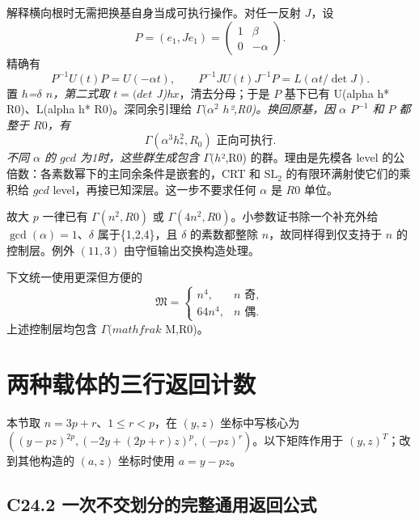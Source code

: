 \documentclass[11pt,a4paper]{article}
\theoremstyle{definition}
\numberwithin{equation}{section}
\begin{document}
{解释横向根时无需把换基自身当成可执行操作。对任一反射} {\ensuremath{J}，设} \[
P=(e_1,Je_1)=\begin{pmatrix}1&\beta\\0&-\alpha\end{pmatrix}.
\] {精确有} \[
P^{-1}U(t)P=U(-\alpha t),\qquad
P^{-1}J U(t)J^{-1}P=L(\alpha t/\det J).
\tag{C23.5.4}
\] {置} {\ensuremath{h}}\emph{{=\ensuremath{\delta }} {\ensuremath{n}，第二式取} {\ensuremath{t=(det}} {J)h}}{\ensuremath{x}，清去分母；于是} {\ensuremath{P}} {基下已有} {U(alpha} {h*} {R0)、L(alpha} {h*} {R0)。深同余引理给} {\ensuremath{\Gamma (\alpha ^{2}}} {\ensuremath{h}}\emph{{²,R0)。换回原基，因} {\ensuremath{\alpha }} {\ensuremath{P^{-1}}} {和} {\ensuremath{P}} {都整于} {\ensuremath{R0}，有} \[
\Gamma(\alpha^3h_*^2,R_0)\text{ 正向可执行}.
\tag{C23.5.5}
\] {不同} {\ensuremath{\alpha }} {的} {\ensuremath{gcd}} {为1时，这些群生成包含} {\ensuremath{\Gamma (h}}}{²,R0)} {的群。理由是先模各} {level} {的公倍数：各素数幂下的主同余条件是嵌套的，CRT} {和} {\ensuremath{\mathrm{SL}_{2}}} {的有限环满射使它们的乘积给} {\ensuremath{gcd}} {level，再接已知深层。这一步不要求任何} {\ensuremath{\alpha }} {是} {\ensuremath{R0}} {单位。}

{故大} {\ensuremath{p}} {一律已有} {\ensuremath{\Gamma (n^{2},R0)}} {或} {\ensuremath{\Gamma (4n^{2},R0)}。小参数证书除一个补充外给} {\ensuremath{\operatorname{gcd}(\alpha )=1}、\ensuremath{\delta }} {属于\{1,2,4\}，且} {\ensuremath{\delta }} {的素数都整除} {\ensuremath{n}，故同样得到仅支持于} {\ensuremath{n}} {的控制层。例外} \((11,3)\) {由守恒输出交换构造处理。}

{下文统一使用更深但方便的} \[
\mathfrak M=\begin{cases}n^4,&n\text{ 奇},\\64n^4,&n\text{ 偶}.
\end{cases}
\tag{C23.5.6}
\] {上述控制层均包含} {\ensuremath{\Gamma (mathfrak}} {M,R0)。}


\section{两种载体的三行返回计数}\label{construct:three-row-transport}
{本节取} \(n=3p+r\){、}\(1\le r<p\){，在} \((y,z)\) {坐标中写核心为} \(((y-pz)^{2p},(-2y+(2p+r)z)^p,(-pz)^r)\){。以下矩阵作用于} \((y,z)^T\){；改到其他构造的} \((a,z)\) {坐标时使用} \(a=y-pz\){。}

\subsection*{\texorpdfstring{{C24.2} {一次不交划分的完整通用返回公式}}{C24.2 一次不交划分的完整通用返回公式}}\label{C24-h154}
\end{document}
